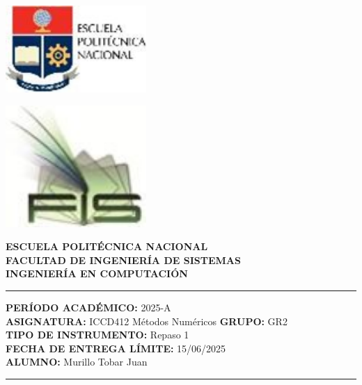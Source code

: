 \documentclass[12pt]{article}
\begin{document}
\begin{minipage}{0.45\textwidth}
    \includegraphics[width=0.4\textwidth]{inFiles/Figures/epnLogo.jpg}
\end{minipage}
\hfill
\begin{minipage}{0.45\textwidth}
    \raggedleft
    \includegraphics[width=0.4\textwidth]{inFiles/Figures/FIS_logo.jpg}
\end{minipage}


\vspace{0.5cm}

\begin{center}
    \textbf{ESCUELA POLITÉCNICA NACIONAL}\\[0.2cm]
    \textbf{FACULTAD DE INGENIERÍA DE SISTEMAS}\\[0.2cm]
    \textbf{INGENIERÍA {\textbf{EN COMPUTACIÓN}}}
\end{center}

\vspace{0.5cm}
\hrule
\vspace{0.5cm}

\noindent\textbf{PERÍODO ACADÉMICO:} 2025-A\\[0.2cm]
\noindent\textbf{ASIGNATURA:} ICCD412 Métodos Numéricos \hfill \textbf{GRUPO:} GR2\\[0.2cm]
\noindent\textbf{TIPO DE INSTRUMENTO:} Repaso 1\\[0.2cm]
\noindent\textbf{FECHA DE ENTREGA LÍMITE:} 15/06/2025\\[0.2cm]
\noindent\textbf{ALUMNO:} Murillo Tobar Juan

\vspace{0.5cm}
\hrule
\vspace{1cm}
\end{document}
